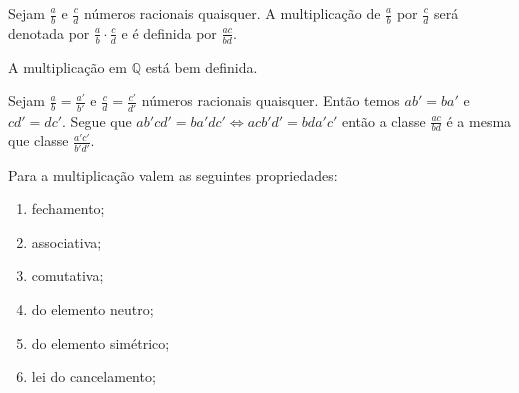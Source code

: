 \documentclass[../main.tex]{subfiles}
\begin{document}
\begin{defi}
    Sejam $\frac{a}{b}$ e $\frac{c}{d}$ números racionais quaisquer. A multiplicação de $\frac{a}{b}$ por $\frac{c}{d}$ será denotada por $\frac{a}{b} \cdot \frac{c}{d}$ e é definida por $\frac{ac}{bd}$.
\end{defi}
\begin{prop}
    A multiplicação em $\mathbb{Q}$ está bem definida.
\end{prop}
\begin{dem}
    Sejam $\frac{a}{b} = \frac{a'}{b'}$ e $\frac{c}{d} = \frac{c'}{d'}$ números racionais quaisquer. Então temos $ab' = ba'$ e $cd' = dc'$. Segue que $ab'cd' = ba'dc' \iff acb'd' = bda'c'$ então a classe $\frac{ac}{bd}$ é a mesma que classe $\frac{a'c'}{b'd'}$.
\end{dem}
\begin{prop}{Para a multiplicação valem as seguintes propriedades:}\label{rac-prop-multiplicacao}
    \begin{enumerate}[label=(\roman*)]
        \item fechamento;
        \item associativa;
        \item comutativa;
        \item do elemento neutro; 
        \item do elemento simétrico;
        \item lei do cancelamento;
    \end{enumerate}
\end{prop}
\end{document}

